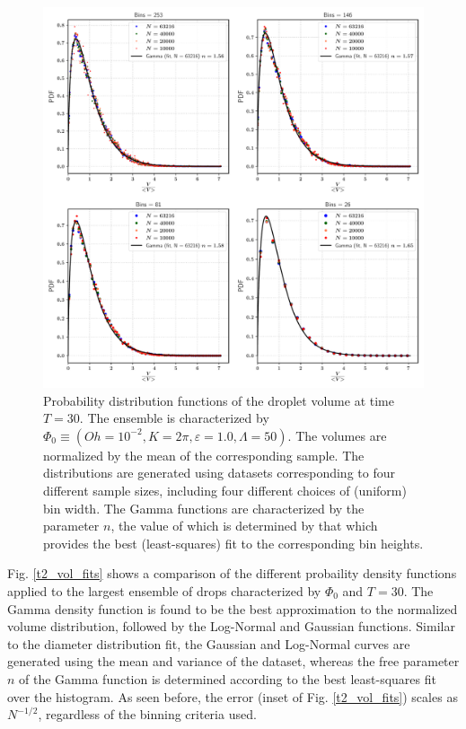 \begin{figure}
\centering
\includegraphics{plots/drop_stats/long_time_volume_bins.pdf}
\caption{Probability distribution functions of the droplet volume at time $T = 30$. 
The ensemble is characterized by $\Phi_0 \equiv \left( Oh = 10^{-2}, K = 2\pi , \varepsilon = 1.0 , \Lambda = 50 \right)$. 
The volumes are normalized by the mean of the corresponding sample.  
The distributions are generated using datasets corresponding to four different sample sizes, 
including four different choices of (uniform) bin width. 
The Gamma functions are characterized by the parameter $n$, the value of which is determined 
by that which provides the best (least-squares) fit to the corresponding bin heights.  
	}
\label{t2_vol_bins}
\end{figure}

Fig. \ref{t2_vol_fits} shows a comparison of the different probaility 
density functions applied to the largest ensemble of drops characterized by $\Phi_0$ and $T=30$. 
The Gamma density function is found to be the best approximation to the normalized 
volume distribution, followed by the Log-Normal and Gaussian functions.
Similar to the diameter distribution fit, the Gaussian and Log-Normal curves are 
generated using the mean and variance of the dataset, 
whereas the free parameter $n$ of the Gamma function is determined
according to the best least-squares fit over the histogram. 
As seen before, the error (inset of Fig. \ref{t2_vol_fits}) 
scales as $N^{-1/2}$, regardless of the binning criteria used. 

